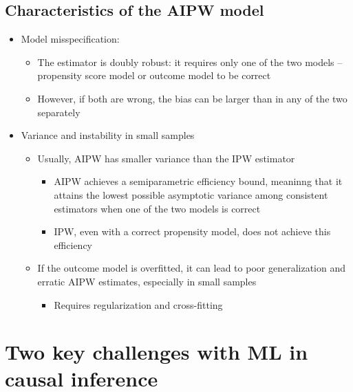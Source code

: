 \documentclass[10pt]{article}
\begin{document}
\subsection{Characteristics of the AIPW model}
\begin{itemize}
    \item Model misspecification: 
    \begin{itemize}
        \item The estimator is doubly robust: it requires only one of the two models -- propensity score model or outcome model to be correct 
        \item However, if both are wrong, the bias can be larger than in any of the two separately
    \end{itemize}
    \item Variance and instability in small samples 
    \begin{itemize}
        \item Usually, AIPW has smaller variance than the IPW estimator 
        \begin{itemize}
            \item AIPW achieves a semiparametric efficiency bound, meaninng that it attains the lowest possible asymptotic variance among consistent estimators when one of the two models is correct 
            \item IPW, even with a correct propensity model, does not achieve this efficiency
        \end{itemize}
        \item If the outcome model is overfitted, it can lead to poor generalization and erratic AIPW estimates, especially in small samples 
        \begin{itemize}
            \item Requires regularization and cross-fitting 
        \end{itemize}
    \end{itemize}
\end{itemize}
\newpage 
\section{Two key challenges with ML in causal inference}
\end{document}

